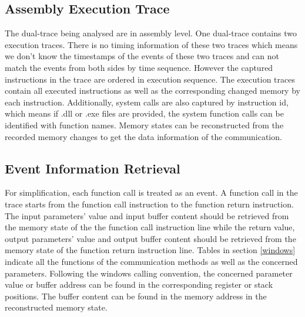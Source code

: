\subsection{Assembly Execution Trace}
The dual-trace being analysed are in assembly level. One dual-trace contains two execution traces. There is no timing information of these two traces which means we don't know the timestamps of the events of these two traces and can not match the events from both sides by time sequence. However the captured instructions in the trace are ordered in execution sequence. The execution traces contain all executed instructions as well as the corresponding changed memory by each instruction. Additionally, system calls are also captured by instruction id, which means if .dll or .exe files are provided, the system function calls can be identified with function names. Memory states can be reconstructed from the recorded memory changes to get the data information of the communication. 

\subsection{Event Information Retrieval}
For simplification, each function call is treated as an event. A function call in the trace starts from the function call instruction to the function return instruction. The input parameters' value and input buffer content should be retrieved from the memory state of the the function call instruction line while the return value, output parameters' value and output buffer content should be retrieved from the memory state of the function return instruction line. Tables in section \ref{windows} indicate all the functions of the communication methods as well as the concerned parameters. Following the windows calling convention, the concerned parameter value or buffer address can be found in the corresponding register or stack positions. The buffer content can be found in the memory address in the reconstructed memory state. 


